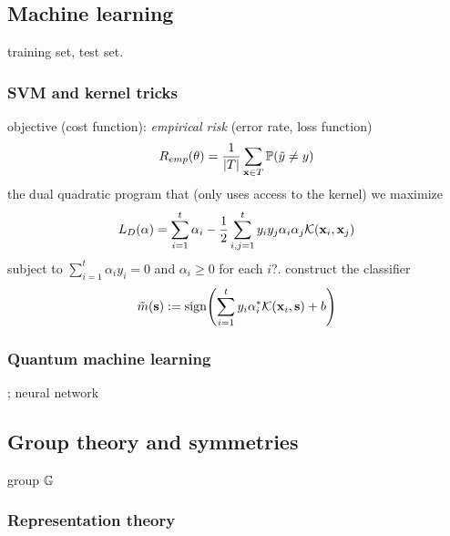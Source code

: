 \subsection{Machine learning}
training set, test set.

\subsubsection{SVM and kernel tricks}
objective (cost function): \emph{empirical risk} (error rate, loss function)
\begin{equation}
	R_{emp}(\vb{\theta}) = \frac{1}{\abs{T}}
	\sum_{\vb{x}\in T} \mathbb{P} (\tilde{y} \neq y)
\end{equation}
the dual quadratic program that (only uses access to the kernel)
we maximize 
\begin{equation}
	L_D(\alpha) = \sum_{i=1}^t \alpha_i - \frac{1}{2}\sum_{i,j=1}^t y_i y_j \alpha_i \alpha_j \mathcal{K}(\vb{x}_i,\vb{x}_j)
\end{equation}
subject to $\sum_{i=1}^t \alpha_i y_i = 0$ and $\alpha_i\ge 0$ for each $i$?.
construct the classifier
\begin{equation}
	\tilde{m}(\vb{s}) := \textup{sign} \qty(
		\sum_{i=1}^t y_i \alpha_i^* \mathcal{K}(\vb{x}_i,\vb{s}) + b
	)
\end{equation}


\subsubsection{Quantum machine learning}\label{sec:quantum_machine_learning}
\cite{biamonteQuantumMachineLearning2017}; neural network

\subsection{Group theory and symmetries}
group $\mathbb{G}$

\subsubsection{Representation theory}\label{sec:representation_theory}

